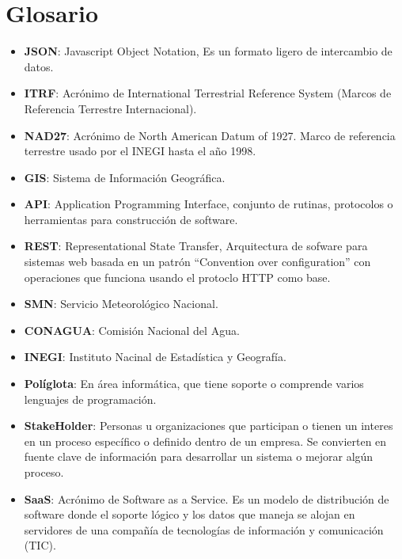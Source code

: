 \newpage
\section*{Glosario}
\begin{itemize}
	\item \textbf{JSON}: Javascript Object Notation, Es un formato ligero de intercambio de datos.
	\item \textbf{ITRF}: Acrónimo de International Terrestrial Reference System (Marcos de Referencia Terrestre Internacional).
	\item \textbf{NAD27}: Acrónimo de North American Datum of 1927. Marco de referencia terrestre usado por el INEGI hasta el año 1998.
	\item \textbf{GIS}: Sistema de Información Geográfica.
  \item \textbf{API}: Application Programming Interface, conjunto de rutinas, protocolos o herramientas para construcción de software.
  \item \textbf{REST}: Representational State Transfer, Arquitectura de sofware para sistemas web basada en un patrón ``Convention over configuration'' con operaciones que funciona usando el protoclo HTTP como base.
  \item \textbf{SMN}: Servicio Meteorológico Nacional.
  \item \textbf{CONAGUA}: Comisión Nacional del Agua.
  \item \textbf{INEGI}: Instituto Nacinal de Estadística y Geografía.
  \item \textbf{Políglota}: En área informática, que tiene soporte o comprende varios lenguajes de programación.
  \item \textbf{StakeHolder}: Personas u organizaciones que participan o tienen un interes en un proceso específico o definido dentro de un empresa. Se convierten en fuente clave de información para desarrollar un sistema o mejorar algún proceso.
  \item \textbf{SaaS}: Acrónimo de Software as a Service. Es un modelo de distribución de software donde el soporte lógico y los datos que maneja se alojan en servidores de una compañía de tecnologías de información y comunicación (TIC).
\end{itemize}

